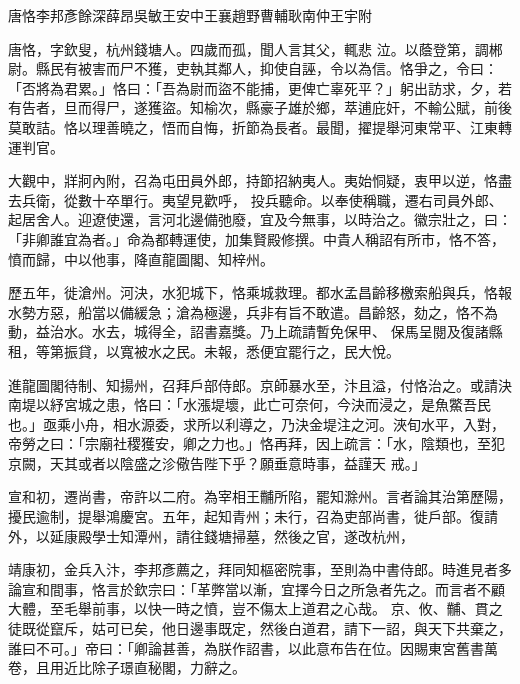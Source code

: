 
\begin{pinyinscope}

 唐恪李邦彥餘深薛昂吳敏王安中王襄趙野曹輔耿南仲王宇附



 唐恪，字欽叟，杭州錢塘人。四歲而孤，聞人言其父，輒悲
 泣。以蔭登第，調郴尉。縣民有被害而尸不獲，吏執其鄰人，抑使自誣，令以為信。恪爭之，令曰：「否將為君累。」恪曰：「吾為尉而盜不能捕，更俾亡辜死平？」躬出訪求，夕，若有告者，旦而得尸，遂獲盜。知榆次，縣豪子雄於鄉，萃逋庇奸，不輸公賦，前後莫敢詰。恪以理善曉之，悟而自悔，折節為長者。最聞，擢提舉河東常平、江東轉運判官。



 大觀中，牂牁內附，召為屯田員外郎，持節招納夷人。夷始恫疑，衷甲以逆，恪盡去兵衛，從數十卒單行。夷望見歡呼，
 投兵聽命。以奉使稱職，遷右司員外郎、起居舍人。迎遼使還，言河北邊備弛廢，宜及今無事，以時治之。徽宗壯之，曰：「非卿誰宜為者。」命為都轉運使，加集賢殿修撰。中貴人稱詔有所市，恪不答，憤而歸，中以他事，降直龍圖閣、知梓州。



 歷五年，徙滄州。河決，水犯城下，恪乘城救理。都水孟昌齡移檄索船與兵，恪報水勢方惡，船當以備緩急；滄為極邊，兵非有旨不敢遣。昌齡怒，劾之，恪不為動，益治水。水去，城得全，詔書嘉獎。乃上疏請暫免保甲、
 保馬呈閱及復諸縣租，等第振貸，以寬被水之民。未報，悉便宜罷行之，民大悅。



 進龍圖閣待制、知揚州，召拜戶部侍郎。京師暴水至，汴且溢，付恪治之。或請決南堤以紓宮城之患，恪曰：「水漲堤壞，此亡可奈何，今決而浸之，是魚鱉吾民也。」亟乘小舟，相水源委，求所以利導之，乃決金堤注之河。浹旬水平，入對，帝勞之曰：「宗廟社稷獲安，卿之力也。」恪再拜，因上疏言：「水，陰類也，至犯京闕，天其或者以陰盛之沴儆告陛下乎？願垂意時事，益謹天
 戒。」



 宣和初，遷尚書，帝許以二府。為宰相王黼所陷，罷知滁州。言者論其治第歷陽，擾民逾制，提舉鴻慶宮。五年，起知青州；未行，召為吏部尚書，徙戶部。復請外，以延康殿學士知潭州，請往錢塘掃墓，然後之官，遂改杭州，



 靖康初，金兵入汴，李邦彥薦之，拜同知樞密院事，至則為中書侍郎。時進見者多論宣和間事，恪言於欽宗曰：「革弊當以漸，宜擇今日之所急者先之。而言者不顧大體，至毛舉前事，以快一時之憤，豈不傷太上道君之心哉。
 京、攸、黼、貫之徒既從竄斥，姑可已矣，他日邊事既定，然後白道君，請下一詔，與天下共棄之，誰曰不可。」帝曰：「卿論甚善，為朕作詔書，以此意布告在位。因賜東宮舊書萬卷，且用近比除子璟直秘閣，力辭之。




\end{pinyinscope}
